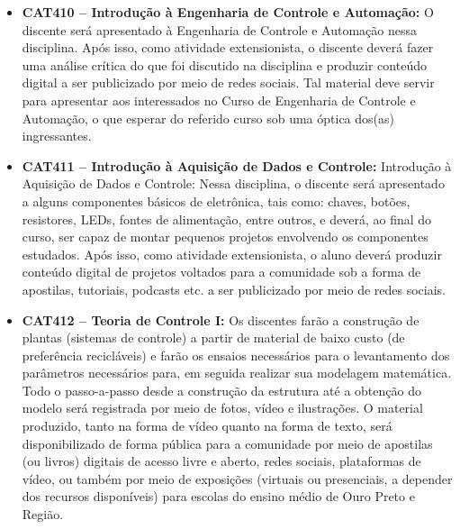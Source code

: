 \documentclass[
	12pt,				%
	openright,			%
	oneside,			%
	a4paper,			%
	english,			%
	brazil				%
	]{abntex2}
\begin{document}
\begin{itemize}
    \item \textbf{CAT410 -- Introdução à Engenharia de Controle e Automação:} O discente  será apresentado à Engenharia de Controle e Automação nessa disciplina. Após isso, como atividade extensionista, o discente deverá fazer uma análise crítica do que foi discutido na disciplina e produzir conteúdo digital a ser publicizado por meio de redes sociais. Tal material deve servir para apresentar aos interessados no Curso de Engenharia de Controle e Automação, o que esperar do referido curso sob uma óptica dos(as) ingressantes.

    \item \textbf{CAT411 -- Introdução à Aquisição de Dados e Controle:} Introdução à Aquisição de Dados e Controle: Nessa disciplina, o discente será apresentado a alguns componentes básicos de eletrônica, tais como: chaves, botões, resistores, LEDs, fontes de alimentação, entre outros, e deverá, ao final do curso, ser capaz de montar pequenos projetos envolvendo os componentes estudados. Após isso, como atividade extensionista, o aluno deverá produzir conteúdo digital de projetos voltados para a comunidade sob a forma de apostilas, tutoriais, podcasts etc. a ser publicizado por meio de redes sociais.

    \item \textbf{CAT412 -- Teoria de Controle I:} Os discentes farão a construção de plantas (sistemas de controle) a partir de material de baixo custo (de preferência recicláveis) e farão os ensaios necessários para o levantamento dos parâmetros necessários para, em seguida realizar sua modelagem matemática. Todo o passo-a-passo desde a construção da estrutura até a obtenção do modelo será registrada por meio de fotos, vídeo e ilustrações. O material produzido, tanto na forma de vídeo quanto na forma de texto, será disponibilizado de forma pública para a comunidade por meio de apostilas (ou livros) digitais de acesso livre e aberto, redes sociais, plataformas de vídeo, ou também por meio de exposições (virtuais ou presenciais, a depender dos recursos disponíveis) para escolas do ensino médio de Ouro Preto e Região.


\end{itemize}
\end{document}
